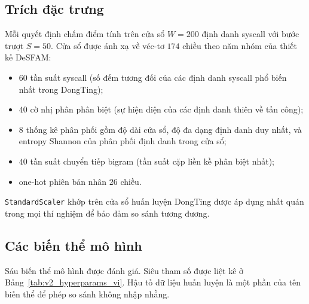 \subsection{Trích đặc trưng}
\label{subsec:features_vi}
Mỗi quyết định chấm điểm tính trên cửa sổ $W=200$ định danh syscall
với bước trượt $S=50$. Cửa sổ được ánh xạ về véc-tơ $174$ chiều theo
năm nhóm của thiết kế DeSFAM:
\begin{itemize}
  \item $60$ tần suất syscall (số đếm tương đối của các định danh
        syscall phổ biến nhất trong DongTing);
  \item $40$ cờ nhị phân phân biệt (sự hiện diện của các định danh
        thiên về tấn công);
  \item $8$ thống kê phân phối gồm độ dài cửa sổ, độ đa dạng định
        danh duy nhất, và entropy Shannon của phân phối định danh
        trong cửa sổ;
  \item $40$ tần suất chuyển tiếp bigram (tần suất cặp liền kề phân
        biệt nhất);
  \item one-hot phiên bản nhân $26$ chiều.
\end{itemize}
\texttt{StandardScaler} khớp trên cửa sổ huấn luyện DongTing được áp
dụng nhất quán trong mọi thí nghiệm để bảo đảm so sánh tương đương.

\subsection{Các biến thể mô hình}
\label{subsec:models_vi}
Sáu biến thể mô hình được đánh giá. Siêu tham số được liệt kê ở
Bảng~\ref{tab:v2_hyperparams_vi}. Hậu tố dữ liệu huấn luyện là một
phần của tên biến thể để phép so sánh không nhập nhằng.

